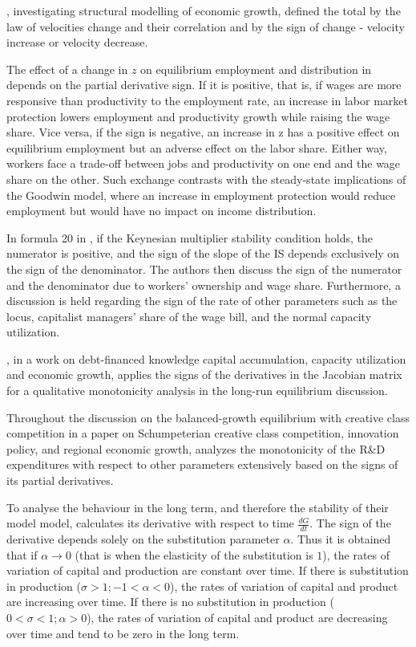 \documentclass[11pt]{book}
\begin{document}
\cite{sukharev2016structural}, investigating structural modelling of economic growth, defined the total by the law of velocities
change and their correlation and by the sign of change - velocity
increase or velocity decrease.

The effect of a change in $z$ on equilibrium employment and distribution
in \cite{tavani2017endogenous} depends on the partial derivative
sign. If it is positive, that is, if wages are more responsive than
productivity to the employment rate, an increase in labor market protection
lowers employment and productivity growth while raising the wage share.
Vice versa, if the sign is negative, an increase in z has a positive
effect on equilibrium employment but an adverse effect on the labor
share. Either way, workers face a trade-off between jobs and productivity
on one end and the wage share on the other. Such exchange contrasts
with the steady-state implications of the Goodwin model, where an
increase in employment protection would reduce employment but would
have no impact on income distribution.

In formula 20 in \cite{palley2017inequality}, if the Keynesian multiplier
stability condition holds, the numerator is positive, and the sign
of the slope of the IS depends exclusively on the sign of the denominator.
The authors then discuss the sign of the numerator and the denominator
due to workers' ownership and wage share. Furthermore, a discussion
is held regarding the sign of the rate of other parameters such as
the locus, capitalist managers' share of the wage bill, and the normal
capacity utilization.

\cite{carvalho2017debt}, in a work on debt-financed knowledge
capital accumulation, capacity utilization and economic growth, applies the signs of the derivatives in the
Jacobian matrix for a qualitative monotonicity analysis in the long-run
equilibrium discussion.

Throughout the discussion on the balanced-growth equilibrium with creative class
competition in a paper on Schumpeterian creative class competition,
innovation policy, and regional economic growth, \cite{batabyal2018schumpeterian} analyzes the monotonicity
of the R\&D expenditures with respect to other parameters extensively
based on the signs of its partial derivatives.

To analyse the behaviour in the long term, and therefore the stability
of their model model, \cite{perez2019economic} calculates its derivative
with respect to time $\frac{dG}{dt}$. The sign of the derivative
depends solely on the substitution parameter $\alpha$. Thus it is
obtained that if $\alpha\rightarrow0$ (that is when the elasticity
of the substitution is $1$), the rates of variation of capital and
production are constant over time. If there is substitution in production
($\sigma>1;-1<\alpha<0$), the rates of variation of capital and product
are increasing over time. If there is no substitution in production
($0<\sigma<1;\alpha>0$), the rates of variation of capital and product
are decreasing over time and tend to be zero in the long term.
\end{document}
